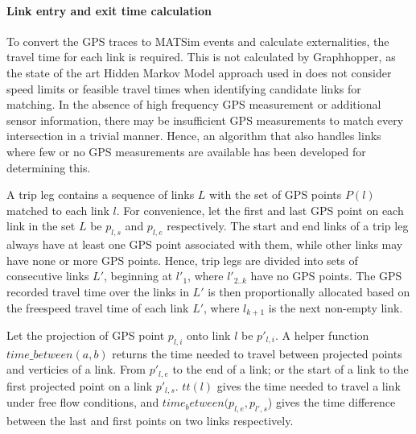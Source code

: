 \paragraph{Link entry and exit time calculation}
To convert the GPS traces to MATSim events and calculate externalities, the travel time for each link is required.
This is not calculated by Graphhopper, as the state of the art Hidden Markov Model approach used in \citep{newson2009hidden} does not consider speed limits or feasible travel times when identifying candidate links for matching.
In the absence of high frequency GPS measurement or additional sensor information, there may be insufficient GPS measurements to match every intersection in a trivial manner.
Hence, an algorithm that also handles links where few or no GPS measurements are available has been developed for determining this.

A trip leg contains a sequence of links $L$ with the set of GPS points $P(l)$ matched to each link $l$.
For convenience, let the first and last GPS point on each link in the set $L$ be $p_{l,s}$ and $p_{l,e}$ respectively.
The start and end links of a trip leg always have at least one GPS point associated with them, while other links may have none or more GPS points.
Hence, trip legs are divided into sets of consecutive links  $L'$, beginning at $l'_1$,  where $l'_{2..k}$ have no GPS points.
The GPS recorded travel time over the links in $L'$ is then proportionally allocated based on the freespeed travel time of each link $L'$, where $l_{k+1}$ is the next non-empty link.

Let the projection of GPS point $p_{l,i}$ onto link $l$ be $p'_{l,i}$.
A helper function $time\_between(a,b)$ returns the time needed to travel between projected points and verticies of a link.
From $p'_{l,e}$ to the end of a link; or the start of a link to the first projected point on a link $p'_{l,s}$.
$tt(l)$ gives the time needed to travel a link under free flow conditions, and $time_between(p_{l,e}, p_{l',s}$) gives the time difference between the last and first points on two links respectively.

